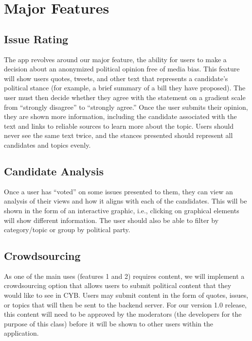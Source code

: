 \documentclass[11pt]{article}
\begin{document}
\section*{Major Features}

\subsection{Issue Rating}

The app revolves around our major feature, the ability for users to make a decision about an anonymized political opinion free of media bias. This feature will show users quotes, tweets, and other text that represents a candidate's political stance (for example, a brief summary of a bill they have proposed). The user must then decide whether they agree with the statement on a gradient scale from ``strongly disagree'' to ``strongly agree.'' Once the user submits their opinion, they are shown more information, including the candidate associated with the text and links to reliable sources to learn more about the topic. Users should never see the same text twice, and the stances presented should represent all candidates and topics evenly.

\subsection{Candidate Analysis}

Once a user has ``voted'' on some issues presented to them, they can view an analysis of their views and how it aligns with each of the candidates. This will be shown in the form of an interactive graphic, i.e., clicking on graphical elements will show different information. The user should also be able to filter by category/topic or group by political party.

\subsection{Crowdsourcing}

As one of the main uses (features 1 and 2) requires content, we will implement a crowdsourcing option that allows users to submit political content that they would like to see in CYB. Users may submit content in the form of quotes, issues, or topics that will then be sent to the backend server. For our version 1.0 release, this content will need to be approved by the moderators (the developers for the purpose of this class) before it will be shown to other users within the application.
\end{document}
